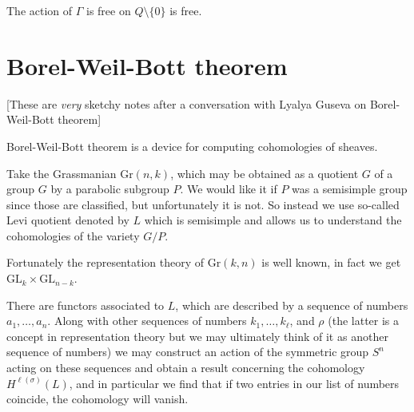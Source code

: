 \begin{lemma}
\label{lemma-action-is-free-outside-origin}
The action of $\Gamma$ is free on $Q\setminus\{0\}$ is free.
\end{lemma}



\section{Borel-Weil-Bott theorem}
\label{section-Borel-Weil-Bott-thoerem}

[These are {\it very} sketchy notes after a conversation with Lyalya Guseva on
Borel-Weil-Bott theorem]

Borel-Weil-Bott theorem is a device for computing cohomologies of sheaves.

Take the Grassmanian $\text{Gr}(n,k)$, which may be obtained as a quotient $G$
of a group $G$ by a parabolic subgroup $P$. We would like it if $P$ was a
semisimple group since those are classified, but unfortunately it is not. 
So instead we use so-called Levi quotient denoted by $L$ which is semisimple
and allows us to understand the cohomologies of the variety $G/P$.

Fortunately the representation theory of $\text{Gr}(k,n)$ is well known, in fact
we get $\text{GL}_k \times \text{GL}_{n-k}$.

There are functors associated to $L$, which are described by a sequence of
numbers $a_1,\ldots,a_n$. Along with other sequences of numbers
$k_1,\ldots,k_\ell$, and $\rho$ (the latter is a concept in representation
theory but we may ultimately think of it as another sequence of numbers) we may
construct an action of the symmetric group $S^n$ acting on these sequences and
obtain a result concerning the cohomology $H^{\ell(\sigma)}(L)$, and in
particular we find that if two entries in our list of numbers coincide, the
cohomology will vanish.







